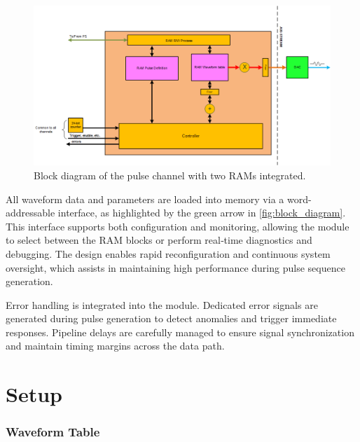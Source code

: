 \begin{figure}[h]
    \centering
    \includegraphics[width=1.0\linewidth]{figures/3.1.png}
    \caption{Block diagram of the pulse channel with two RAMs integrated.}
    \label{fig:block_diagram}
\end{figure}

All waveform data and parameters are loaded into memory via a word-addressable interface, as highlighted by the green arrow in \autoref{fig:block_diagram}. This interface supports both configuration and monitoring, allowing the module to select between the RAM blocks or perform real‐time diagnostics and debugging. The design enables rapid reconfiguration and continuous system oversight, which assists in maintaining high performance during pulse sequence generation.

Error handling is integrated into the module. Dedicated error signals are generated during pulse generation to detect anomalies and trigger immediate responses. Pipeline delays are carefully managed to ensure signal synchronization and maintain timing margins across the data path.

\section{Setup}
\subsubsection{Waveform Table}

